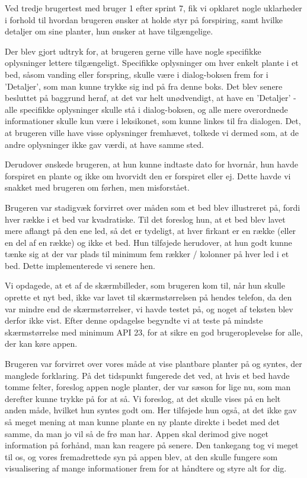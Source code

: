 Ved tredje brugertest med bruger 1 efter sprint 7, fik vi opklaret nogle uklarheder i forhold til hvordan brugeren ønsker at holde styr på forspiring, samt hvilke detaljer om sine planter, hun ønsker at have tilgængelige.

Der blev gjort udtryk for, at brugeren gerne ville have nogle specifikke oplysninger lettere tilgængeligt. Specifikke oplysninger om hver enkelt plante i et bed, såsom vanding eller forspring, skulle være i dialog-boksen frem for i 'Detaljer', som man kunne trykke sig ind på fra denne boks. Det blev senere besluttet på baggrund heraf, at det var helt unødvendigt, at have en 'Detaljer' - alle specifikke oplysninger skulle stå i dialog-boksen, og alle mere overordnede informationer skulle kun være i leksikonet, som kunne linkes til fra dialogen. Det, at brugeren ville have visse oplysninger fremhævet, tolkede vi dermed som, at de andre oplysninger ikke gav værdi, at have samme sted.

Derudover ønskede brugeren, at hun kunne indtaste dato for hvornår, hun havde forspiret en plante og ikke om hvorvidt den er forspiret eller ej. Dette havde vi snakket med brugeren om førhen, men misforstået.

Brugeren var stadigvæk forvirret over måden som et bed blev illustreret på, fordi hver række i et bed var kvadratiske. Til det foreslog hun, at et bed blev lavet mere aflangt på den ene led, så det er tydeligt, at hver firkant er en række (eller en del af en række) og ikke et bed. Hun tilføjede herudover, at hun godt kunne tænke sig at der var plads til minimum fem rækker / kolonner på hver led i et bed. Dette implementerede vi senere hen.

Vi opdagede, at et af de skærmbilleder, som brugeren kom til, når hun skulle oprette et nyt bed, ikke var lavet til skærmstørrelsen på hendes telefon, da den var mindre end de skærmstørrelser, vi havde testet på, og noget af teksten blev derfor ikke vist. Efter denne opdagelse begyndte vi at teste på mindste skærmstørrelse med minimum API 23, for at sikre en god brugeroplevelse for alle, der kan køre appen.

Brugeren var forvirret over vores måde at vise plantbare planter på og syntes, der manglede forklaring. På det tidspunkt fungerede det ved, at hvis et bed havde tomme felter, foreslog appen nogle planter, der var sæson for lige nu, som man derefter kunne trykke på for at så. Vi foreslog, at det skulle vises på en helt anden måde, hvilket hun syntes godt om. Her tilføjede hun også, at det ikke gav så meget mening at man kunne plante en ny plante direkte i bedet med det samme, da man jo vil så de frø man har. Appen skal derimod give noget information på forhånd, man kan reagere på senere. Den tankegang tog vi meget til os, og vores fremadrettede syn på appen blev, at den skulle fungere som visualisering af mange informationer frem for at håndtere og styre alt for dig.

